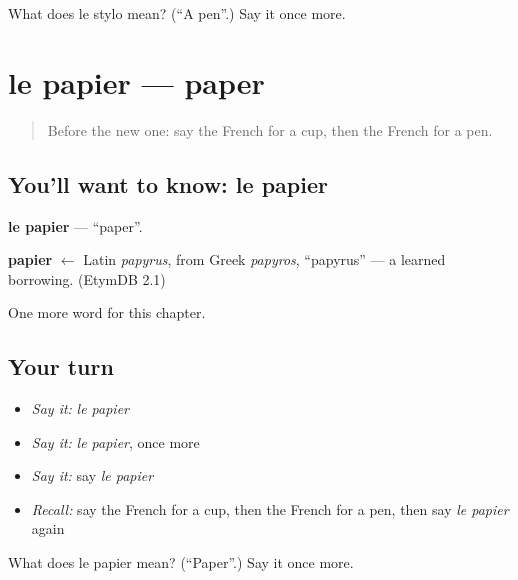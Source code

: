 \begin{tcolorbox}[breakable,colback=teal!4,colframe=teal!35!black,title={Before you move on}]
What does le stylo mean? (\textquotedblleft{}A pen\textquotedblright{}.) Say it once more.
\end{tcolorbox}
\section[le papier]{le papier — paper}

\label{lesson:FR-C78-papier}



\begin{quote}
Before the new one: say the French for a cup, then the French for a pen.
\end{quote}

\subsection*{You'll want to know: le papier}
\textbf{le papier} — \textquotedblleft{}paper\textquotedblright{}.

\begin{cousinweb}
\textbf{papier} $\leftarrow$ Latin \emph{papyrus}, from Greek \emph{papyros}, \textquotedblleft{}papyrus\textquotedblright{} — a learned borrowing. (EtymDB 2.1)
\end{cousinweb}

\begin{grammarlens}[title={What you've built}]
One more word for this chapter.
\end{grammarlens}

\subsection*{Your turn}
\begin{itemize}
\raggedright
  \item \emph{Say it:} \emph{le papier}
  \item \emph{Say it:} \emph{le papier}, once more
  \item \emph{Say it:} say \emph{le papier}
  \item \emph{Recall:} say the French for a cup, then the French for a pen, then say \emph{le papier} again
\end{itemize}

\begin{tcolorbox}[breakable,colback=teal!4,colframe=teal!35!black,title={Before you move on}]
What does le papier mean? (\textquotedblleft{}Paper\textquotedblright{}.) Say it once more.
\end{tcolorbox}
